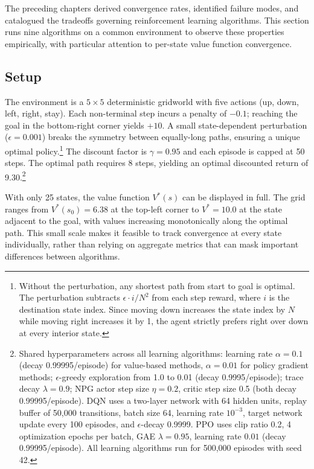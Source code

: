 
The preceding chapters derived convergence rates, identified failure modes, and catalogued the tradeoffs governing reinforcement learning algorithms. This section runs nine algorithms on a common environment to observe these properties empirically, with particular attention to per-state value function convergence.

\subsection{Setup}
\label{sec:illustrated_setup}

The environment is a $5 \times 5$ deterministic gridworld with five actions (up, down, left, right, stay). Each non-terminal step incurs a penalty of $-0.1$; reaching the goal in the bottom-right corner yields $+10$. A small state-dependent perturbation ($\epsilon = 0.001$) breaks the symmetry between equally-long paths, ensuring a unique optimal policy.\footnote{Without the perturbation, any shortest path from start to goal is optimal. The perturbation subtracts $\epsilon \cdot i/N^2$ from each step reward, where $i$ is the destination state index. Since moving down increases the state index by $N$ while moving right increases it by 1, the agent strictly prefers right over down at every interior state.} The discount factor is $\gamma = 0.95$ and each episode is capped at 50 steps. The optimal path requires 8 steps, yielding an optimal discounted return of 9.30.\footnote{Shared hyperparameters across all learning algorithms: learning rate $\alpha = 0.1$ (decay 0.99995/episode) for value-based methods, $\alpha = 0.01$ for policy gradient methods; $\epsilon$-greedy exploration from 1.0 to 0.01 (decay 0.9995/episode); trace decay $\lambda = 0.9$; NPG actor step size $\eta = 0.2$, critic step size 0.5 (both decay 0.99995/episode). DQN uses a two-layer network with 64 hidden units, replay buffer of 50,000 transitions, batch size 64, learning rate $10^{-3}$, target network update every 100 episodes, and $\epsilon$-decay 0.9999. PPO uses clip ratio 0.2, 4 optimization epochs per batch, GAE $\lambda = 0.95$, learning rate $0.01$ (decay 0.99995/episode). All learning algorithms run for 500,000 episodes with seed 42.}

With only 25 states, the value function $V^*(s)$ can be displayed in full. The grid ranges from $V^*(s_0) = 6.38$ at the top-left corner to $V^* = 10.0$ at the state adjacent to the goal, with values increasing monotonically along the optimal path. This small scale makes it feasible to track convergence at every state individually, rather than relying on aggregate metrics that can mask important differences between algorithms.

